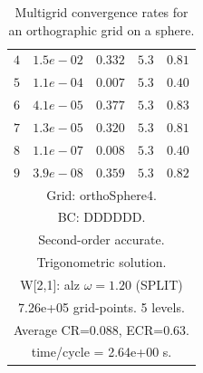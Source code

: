 \begin{table}[hbt]
\begin{center}
{\begin{tabular}{|c|c|c|c|c|}
 $ 4$  & $ 1.5e-02$ & $0.332$ & $ 5.3$ & $0.81$ \\ 
 $ 5$  & $ 1.1e-04$ & $0.007$ & $ 5.3$ & $0.40$ \\ 
 $ 6$  & $ 4.1e-05$ & $0.377$ & $ 5.3$ & $0.83$ \\ 
 $ 7$  & $ 1.3e-05$ & $0.320$ & $ 5.3$ & $0.81$ \\ 
 $ 8$  & $ 1.1e-07$ & $0.008$ & $ 5.3$ & $0.40$ \\ 
 $ 9$  & $ 3.9e-08$ & $0.359$ & $ 5.3$ & $0.82$ \\ 
\hline 
\multicolumn{5}{|c|}{Grid: orthoSphere4.}  \\
\multicolumn{5}{|c|}{BC: DDDDDD.}  \\
\multicolumn{5}{|c|}{Second-order accurate.}  \\
\multicolumn{5}{|c|}{Trigonometric solution.}  \\
\multicolumn{5}{|c|}{W[2,1]: alz $\omega=1.20$ (SPLIT)}  \\
\multicolumn{5}{|c|}{7.26e+05 grid-points. 5 levels.}  \\
\multicolumn{5}{|c|}{Average CR=$0.088$, ECR=$0.63$.}  \\
\multicolumn{5}{|c|}{time/cycle = 2.64e+00 s.}  \\
\hline 
\end{tabular}
} %
\end{center}
\caption{Multigrid convergence rates for an orthographic grid on a sphere.}
\label{fig:cylinder}
\end{table}


